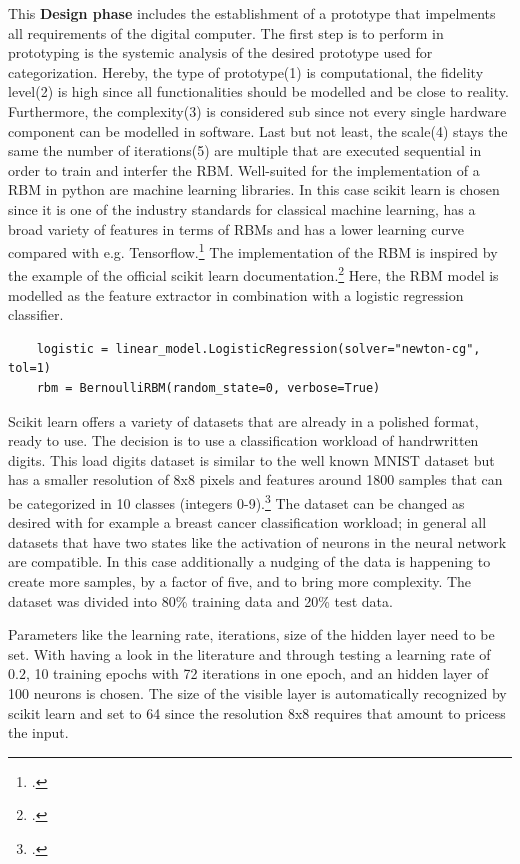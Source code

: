 This \textbf{Design phase} includes the establishment of a prototype that impelments all requirements of the digital computer.
The first step is to perform in prototyping is the systemic analysis of the desired prototype used for categorization.
Hereby, the type of prototype(1) is computational, the fidelity level(2) is high since all functionalities should be modelled and be close to reality. 
Furthermore, the complexity(3) is considered sub since not every single hardware component can be modelled in software. 
Last but not least, the scale(4) stays the same the number of iterations(5) are multiple that are executed sequential in order to train and interfer the \ac{RBM}.
Well-suited for the implementation of a \ac{RBM} in python are machine learning libraries. 
In this case scikit learn is chosen since it is one of the industry standards for classical machine learning, has a broad variety of features in terms of \ac{RBM}s
and has a lower learning curve compared with e.g. Tensorflow.\footcite[cf.][5-6]{raschkaMachineLearningPython2020}
The implementation of the \ac{RBM} is inspired by the example of the official scikit learn documentation.\footcite[cf.][1]{RestrictedBoltzmannMachine}
Here, the RBM model is modelled as the feature extractor in combination with a logistic regression classifier.

\begin{lstlisting}
    logistic = linear_model.LogisticRegression(solver="newton-cg", tol=1)
    rbm = BernoulliRBM(random_state=0, verbose=True)
\end{lstlisting}
Scikit learn offers a variety of datasets that are already in a polished format, ready to use. 
The decision is to use a classification workload of handrwritten digits.
This load digits dataset is similar to the well known MNIST dataset but has a smaller resolution of 8x8 pixels and features around 1800 samples that can be categorized in 10 classes (integers 0-9).\footcite[cf.][1]{SklearnDatasetsLoad_digits}
The dataset can be changed as desired with for example a breast cancer classification workload; in general all datasets that have two states like the activation of neurons in the neural network are compatible.
In this case additionally a nudging of the data is happening to create more samples, by a factor of five, and to bring more complexity. 
The dataset was divided into 80\% training data and 20\% test data.

Parameters like the learning rate, iterations, size of the hidden layer need to be set. 
With having a look in the literature and through testing a learning rate of \(0.2\), 10 training epochs with 72 iterations in one epoch, and an hidden layer of 100 neurons is chosen.
The size of the visible layer is automatically recognized by scikit learn and set to 64 since the resolution 8x8 requires that amount to pricess the input.

